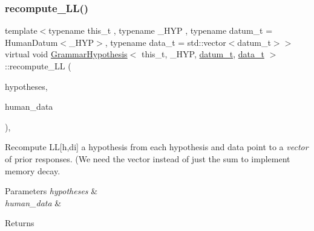 \subsubsection{\texorpdfstring{recompute\+\_\+\+L\+L()}{recompute\_LL()}}
{\footnotesize\ttfamily template$<$typename this\+\_\+t , typename \+\_\+\+H\+YP , typename datum\+\_\+t  = Human\+Datum$<$\+\_\+\+H\+Y\+P$>$, typename data\+\_\+t  = std\+::vector$<$datum\+\_\+t$>$$>$ \\
virtual void \hyperlink{class_grammar_hypothesis}{Grammar\+Hypothesis}$<$ this\+\_\+t, \+\_\+\+H\+YP, \hyperlink{class_bayesable_a9f1a6c0cd7855550fa10b1a8f13a5867}{datum\+\_\+t}, \hyperlink{class_bayesable_aa2788c4d7718c0a824e1d28c4c98f921}{data\+\_\+t} $>$\+::recompute\+\_\+\+LL (\begin{DoxyParamCaption}\item[{std\+::vector$<$ \hyperlink{class_grammar_hypothesis_a28fc99df28de741179719c94ecd77699}{H\+YP} $>$ \&}]{hypotheses,  }\item[{const \hyperlink{class_bayesable_aa2788c4d7718c0a824e1d28c4c98f921}{data\+\_\+t} \&}]{human\+\_\+data }\end{DoxyParamCaption})\hspace{0.3cm}{\ttfamily [inline]}, {\ttfamily [virtual]}}



Recompute LL\mbox{[}h,di\mbox{]} a hypothesis from each hypothesis and data point to a {\itshape vector} of prior responses. (We need the vector instead of just the sum to implement memory decay. 


\begin{DoxyParams}{Parameters}
{\em hypotheses} & \\
\hline
{\em human\+\_\+data} & \\
\hline
\end{DoxyParams}
\begin{DoxyReturn}{Returns}

\end{DoxyReturn}
\mbox{\label{class_grammar_hypothesis_a5dc4c47ed55185ec1d1376bd0e7cdb40}} 
